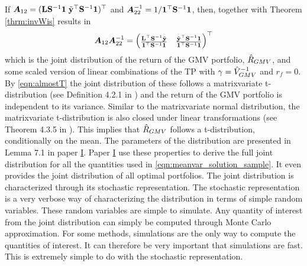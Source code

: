 \documentclass[12pt, twoside]{book}\usepackage{knitr}
\begin{document}
If $\mbox{\boldmath$A$}_{12}=(\mathbf{L} \mathbf{S}^{-1} \mathbf{1} \; \tilde{\mathbf{y}}^\top \mathbf{S}^{-1} \mathbf{1})^\top$ and $\mbox{\boldmath$A$}_{22}^{-1}=1/\mathbf{1}^\top \mathbf{S}^{-1} \mathbf{1}$, then, together with Theorem \ref{thrm:invWis} results in
$$
\mbox{\boldmath$A$}_{12}\mbox{\boldmath$A$}^{-1}_{22}= 
\begin{pmatrix}
  \frac{\mathbf{L}^\top \mathbf{S}^{-1} \tilde {\mathbf{y}}}{\mathbf{1}^\top \mathbf{S}^{-1} \mathbf{1}} &
  \frac{\tilde{\mathbf{y}}^\top \mathbf{S}^{-1} \mathbf{1}}{\mathbf{1}^\top \mathbf{S}^{-1} \mathbf{1}}
\end{pmatrix}^\top
$$
which is the joint distribution of the return of the GMV portfolio, $\hat{R}_{GMV}$, and some scaled version of linear combinations of the TP with $\gamma = \hat{V}_{GMV}^{-1}$ and $r_f=0$.
By \eqref{eqn:almostT} the joint distribution of these follows a matrixvariate t-distribution (see Definition 4.2.1 in \cite{GuptaNagar2000}) and the return of the GMV portfolio is independent to its variance. 
Similar to the matrixvariate normal distribution, the matrixvariate t-distribution is also closed under linear transformations (see Theorem 4.3.5 in \cite{GuptaNagar2000}).
This implies that $\hat{R}_{GMV}$ follows a t-distribution, conditionally on the mean.
The parameters of the distribution are presented in Lemma 7.1 in paper \hyperref[sec:paper1]{I}. 
Paper \hyperref[sec:paper1]{I} use these properties to derive the full joint distribution for all the quantities used in \eqref{eqn:meanvar_solution_sample}.
It even provides the joint distribution of all optimal portfolios. 
The joint distribution is characterized through its stochastic representation.
The stochastic representation is a very verbose way of characterizing the distribution in terms of simple random variables.
These random variables are simple to simulate.
Any quantity of interest from the joint distribution can simply be computed through Monte Carlo approximation. 
For some methods, simulations are the only way to compute the quantities of interest.
It can therefore be very important that simulations are fast.
This is extremely simple to do with the stochastic representation.
\end{document}
